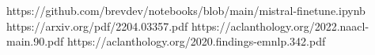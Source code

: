 https://github.com/brevdev/notebooks/blob/main/mistral-finetune.ipynb
https://arxiv.org/pdf/2204.03357.pdf
https://aclanthology.org/2022.naacl-main.90.pdf
https://aclanthology.org/2020.findings-emnlp.342.pdf